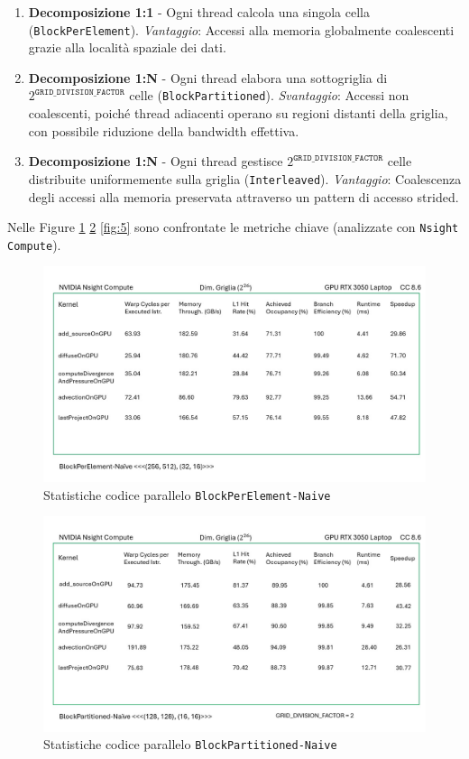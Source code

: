 \documentclass[12pt,a4paper,openany,twoside]{article}
\begin{document}
\begin{enumerate}
\item \textbf{Decomposizione 1:1} - Ogni thread calcola una singola cella (\texttt{BlockPerElement}).
\textit{Vantaggio}: Accessi alla memoria globalmente coalescenti grazie alla località spaziale dei dati.

\item \textbf{Decomposizione 1:N} - Ogni thread elabora una sottogriglia di \(2^{\texttt{GRID\_DIVISION\_FACTOR}}\) celle (\texttt{BlockPartitioned}).  
\textit{Svantaggio}: Accessi non coalescenti, poiché thread adiacenti operano su regioni distanti della griglia, con possibile riduzione della bandwidth effettiva.

\item \textbf{Decomposizione 1:N} - Ogni thread gestisce \(2^{\texttt{GRID\_DIVISION\_FACTOR}}\) celle distribuite uniformemente sulla griglia (\texttt{Interleaved}).  
\textit{Vantaggio}: Coalescenza degli accessi alla memoria preservata attraverso un pattern di accesso strided.

\end{enumerate}

Nelle Figure \ref{fig:2} \ref{fig:3} \ref{fig:5} sono confrontate le metriche chiave (analizzate con \texttt{Nsight Compute}).

\begin{figure}
    \centering
    \includegraphics[width=0.75\linewidth]{figures/Slide2.jpg}
    \caption{Statistiche codice parallelo \texttt{BlockPerElement-Naive}}
    \label{fig:2}
\end{figure}

\begin{figure}
    \centering
    \includegraphics[width=0.75\linewidth]{figures/Slide3.jpg}
    \caption{Statistiche codice parallelo \texttt{BlockPartitioned-Naive}}
    \label{fig:3}
\end{figure}
\end{document}

